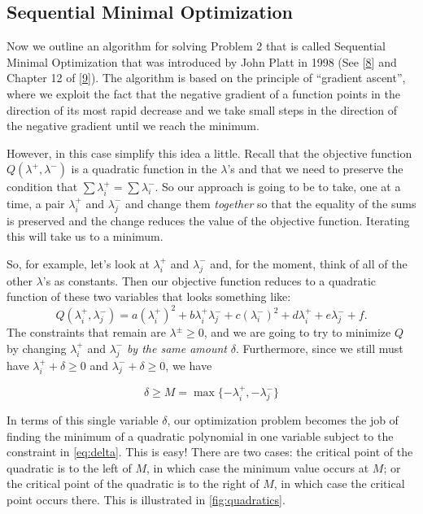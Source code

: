 \documentclass[
  oneside]{scrbook}
\begin{document}
\hypertarget{sequential-minimal-optimization}{%
\subsection{Sequential Minimal
Optimization}\label{sequential-minimal-optimization}}

Now we outline an algorithm for solving Problem 2 that is called
Sequential Minimal Optimization that was introduced by John Platt in
1998 (See {[}\protect\hyperlink{ref-plattSMO}{8}{]} and Chapter 12 of
{[}\protect\hyperlink{ref-KernelMethodAdvances}{9}{]}). The algorithm is
based on the principle of ``gradient ascent'', where we exploit the fact
that the negative gradient of a function points in the direction of its
most rapid decrease and we take small steps in the direction of the
negative gradient until we reach the minimum.

However, in this case simplify this idea a little. Recall that the
objective function \(Q(\lambda^{+},\lambda^{-})\) is a quadratic
function in the \(\lambda\)'s and that we need to preserve the condition
that \(\sum \lambda^{+}_{i}=\sum\lambda^{-}_{i}\). So our approach is
going to be to take, one at a time, a pair \(\lambda^{+}_{i}\) and
\(\lambda^{-}_{j}\) and change them \emph{together} so that the equality
of the sums is preserved and the change reduces the value of the
objective function. Iterating this will take us to a minimum.

So, for example, let's look at \(\lambda^{+}_i\) and \(\lambda^{-}_{j}\)
and, for the moment, think of all of the other \(\lambda\)'s as
constants. Then our objective function reduces to a quadratic function
of these two variables that looks something like: \[
Q(\lambda_{i}^{+},\lambda_{j}^{-}) = a(\lambda^{+}_i)^2+b\lambda^{+}_i\lambda^{-}_j+c(\lambda^{-}_{i})^2+d\lambda^{+}_i+e\lambda^{-}_{j}+f.
\] The constraints that remain are \(\lambda^{\pm}\ge 0\), and we are
going to try to minimize \(Q\) by changing \(\lambda_{i}^{+}\) and
\(\lambda_{j}^{-}\) \emph{by the same amount} \(\delta\). Furthermore,
since we still must have \(\lambda_{i}^{+}+\delta\ge 0\) and
\(\lambda_{j}^{-}+\delta\ge 0\), we have

\begin{equation}
\delta\ge M=\max\{-\lambda_{i}^{+},-\lambda_{j}^{-}\}
\label{eq:delta}\end{equation}

In terms of this single variable \(\delta\), our optimization problem
becomes the job of finding the minimum of a quadratic polynomial in one
variable subject to the constraint in \cref{eq:delta}. This is easy!
There are two cases: the critical point of the quadratic is to the left
of \(M\), in which case the minimum value occurs at \(M\); or the
critical point of the quadratic is to the right of \(M\), in which case
the critical point occurs there. This is illustrated in
\cref{fig:quadratics}.
\end{document}
